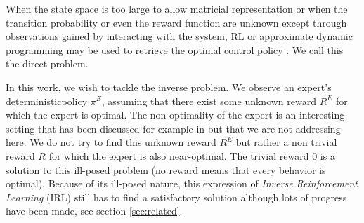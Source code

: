 \documentclass[smallextended]{svjour3}
\begin{document}
When the state space is too large to allow matricial representation or when the transition probability or even the reward function are unknown except through observations gained by interacting with the system, RL or approximate dynamic programming may be used to retrieve the optimal control policy \cite{sutton1998reinforcement}. We call this the direct problem.

In this work, we wish to tackle the inverse problem. We observe an expert's deterministic\footnotemark[\value{footnote}] policy $\pi^E$, assuming that there exist some unknown reward $R^E$ for which the expert is optimal. The non optimality of the expert is an interesting setting that has been discussed for example in \cite{meloXXXanalysis} but that we are not addressing here. We do not try to find this unknown reward $R^E$ but rather a non trivial reward $R$ for which the expert is also near-optimal. The trivial reward $0$ is a solution to this ill-posed problem (no reward means that every behavior is optimal). Because of its ill-posed nature, this expression of \emph{Inverse Reinforcement Learning} (IRL) still has to find a satisfactory solution although lots of progress have been made, see section \ref{sec:related}.
\end{document}

